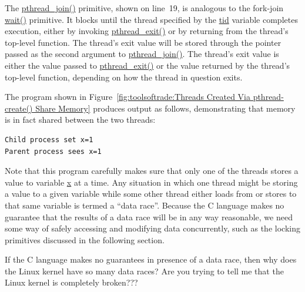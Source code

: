 The \url{pthread_join()} primitive, shown on line~19,  is analogous to
the fork-join \url{wait()} primitive.
It blocks until the thread specified by the \url{tid} variable completes
execution, either by invoking \url{pthread_exit()} or by returning from
the thread's top-level function.
The thread's exit value will be stored through the pointer passed as the
second argument to \url{pthread_join()}.
The thread's exit value is either the value passed to \url{pthread_exit()}
or the value returned by the thread's top-level function, depending on
how the thread in question exits.

The program shown in
Figure~\ref{fig:toolsoftrade:Threads Created Via pthread-create() Share Memory}
produces output as follows, demonstrating that memory is in fact
shared between the two threads:

\vspace{5pt}
\begin{minipage}[t]{\columnwidth}
\begin{verbatim}
Child process set x=1
Parent process sees x=1
\end{verbatim}
\end{minipage}
\vspace{5pt}

Note that this program carefully makes sure that only one of the threads
stores a value to variable \url{x} at a time.
Any situation in which one thread might be storing a value to a given
variable while some other thread either loads from or stores to that
same variable is termed a ``data race''.
Because the C language makes no guarantee that the results of a data race
will be in any way reasonable, we need some way of safely accessing
and modifying data concurrently, such as the locking primitives discussed
in the following section.

\QuickQuiz{}
	If the C language makes no guarantees in presence of a data
	race, then why does the Linux kernel have so many data races?
	Are you trying to tell me that the Linux kernel is completely
	broken???
 \QuickQuizEnd

